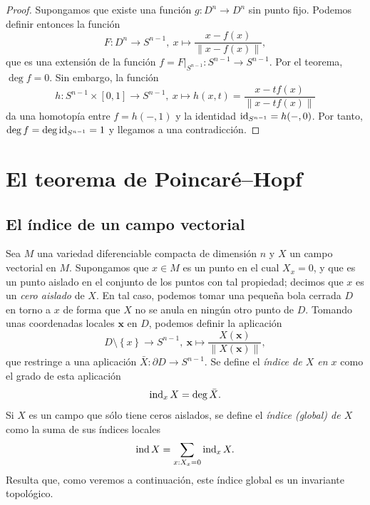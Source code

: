 \documentclass[11pt,a4paper]{amsbook}
\theoremstyle{remark} \newtheorem{rmk}[subsection]{Observación}
\theoremstyle{definition} \newtheorem{defn}[subsection]{Definición}
\theoremstyle{definition} \newtheorem{ex}[subsection]{Ejemplo}
\theoremstyle{definition} \newtheorem{ej}[subsection]{Ejercicio}
\begin{document}
\begin{proof}
 Supongamos que existe una función $g:D^n\rightarrow D^n$ sin punto fijo. Podemos definir entonces la función
  \begin{equation*}
F: D^n \rightarrow S^{n-1}, \ x \mapsto \frac{x-f(x)}{\lVert x-f(x) \rVert},
  \end{equation*}
  que es una extensión de la función $f=F|_{S^{n-1}}:S^{n-1}\rightarrow S^{n-1}$. Por el teorema, $\deg f = 0$. Sin embargo, la función
  \begin{equation*}
h: S^{n-1} \times [0,1] \rightarrow S^{n-1}, \ x \mapsto h(x,t) = \frac{x-tf(x)}{\lVert x-tf(x) \rVert}
  \end{equation*}
  da una homotopía entre $f=h(-,1)$ y la identidad $\mathrm{id}_{S^{n-1}}=h(-,0)$. Por tanto, $\deg f = \deg \mathrm{id}_{S^{n-1}} = 1$ y llegamos a una contradicción.
\end{proof}

\section{El teorema de Poincaré--Hopf}
\subsection{El índice de un campo vectorial} Sea $M$ una variedad diferenciable compacta de dimensión $n$ y $X$ un campo vectorial en $M$. Supongamos que $x\in M$ es un punto en el cual $X_x=0$, y que es un punto aislado en el conjunto de los puntos con tal propiedad; decimos que $x$ es un \emph{cero aislado} de $X$. En tal caso, podemos tomar una pequeña bola cerrada $D$ en torno a $x$ de forma que $X$ no se anula en ningún otro punto de $D$. Tomando unas coordenadas locales $\bm{x}$ en $D$, podemos definir la aplicación
\begin{equation*}
D \setminus \left\{ x \right\} \rightarrow S^{n-1}, \ \bm{x} \mapsto \frac{X(\bm{x})}{\lVert X(\bm{x}) \rVert},
\end{equation*}
que restringe a una aplicación $\bar{X}:\partial D \rightarrow S^{n-1}$. Se define el \emph{índice de $X$ en $x$} como el grado de esta aplicación
\begin{equation*}
\operatorname{ind}_xX = \deg \bar{X}.
\end{equation*}
Si $X$ es un campo que sólo tiene ceros aislados, se define el \emph{índice (global) de $X$} como la suma de sus índices locales
\begin{equation*}
\operatorname{ind} X = \sum_{x: X_x=0} \operatorname{ind}_xX.
\end{equation*}
Resulta que, como veremos a continuación, este índice global es un invariante topológico.
\end{document}
